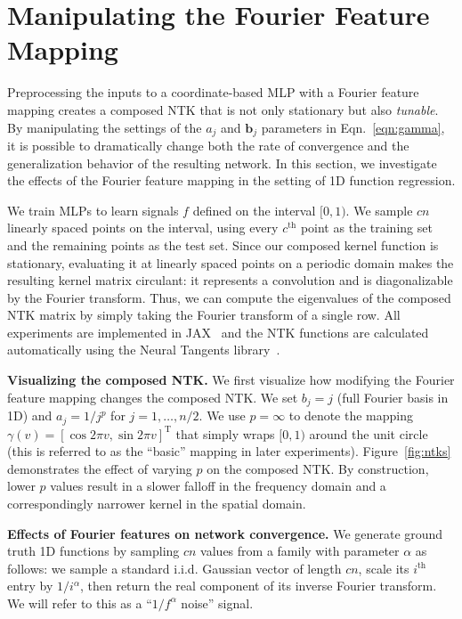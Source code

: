 \section{Manipulating the Fourier Feature Mapping}
\label{sec:optimization}

Preprocessing the inputs to a coordinate-based MLP with a Fourier feature mapping creates a composed NTK that is not only stationary but also \emph{tunable}. By manipulating the settings of the $a_j$ and $\mathbf b_j$ parameters in Eqn.~\ref{eqn:gamma}, it is possible to dramatically change both the rate of convergence and the generalization behavior of the resulting network. In this section, we investigate the effects of the Fourier feature mapping in the setting of 1D function regression.

We train MLPs to learn signals $f$ defined on the interval $[0,1)$. We sample $c n$ linearly spaced points on the interval, using every $c^\textrm{th}$ point as the training set and the remaining points as the test set. Since our composed kernel function is stationary, evaluating it at linearly spaced points on a periodic domain makes the resulting kernel matrix circulant: it represents a convolution and is diagonalizable by the Fourier transform. Thus, we can compute the eigenvalues of the composed NTK matrix by simply taking the Fourier transform of a single row. All experiments are implemented in JAX~\cite{jax2018github} and the NTK functions are calculated automatically using the Neural Tangents library~\cite{neuraltangents2020}.

{\bf Visualizing the composed NTK.} We first visualize how modifying the Fourier feature mapping changes the composed NTK. We set $b_j = j$ (full Fourier basis in 1D) and $a_j = 1/j^p$ for $j = 1,\ldots, n/2$. We use $p=\infty$ to denote the mapping $\gamma(v) = \left[ \cos 2\pi v, \sin 2\pi v \right]^\mathrm{T}$ that simply wraps $[0,1)$ around the unit circle (this is referred to as the ``basic'' mapping in later experiments).
Figure~\ref{fig:ntks} demonstrates the effect of varying $p$ on the composed NTK. By construction, lower $p$ values result in a slower falloff in the frequency domain and a correspondingly narrower kernel in the spatial domain.

{\bf Effects of Fourier features on network convergence.} We generate ground truth 1D functions by sampling $cn$ values from a family with parameter $\alpha$ as follows: we sample a standard i.i.d. Gaussian vector of length $cn$, scale its $i^\textrm{th}$ entry by $1/i^{\alpha}$, then return the real component of its inverse Fourier transform. We will refer to this as a ``$1/f^\alpha$ noise'' signal.


